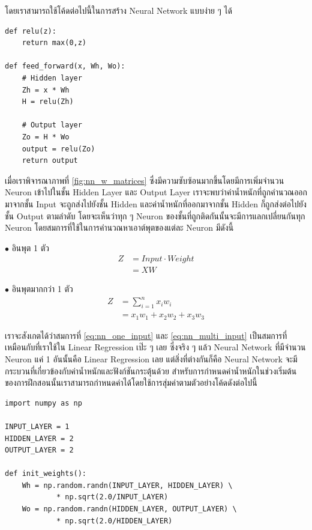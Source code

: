 โดยเราสามารถใช้โค้ดต่อไปนี้ในการสร้าง Neural Network แบบง่าย ๆ ได้

\begin{lstlisting}[style=MyPython]
def relu(z):
    return max(0,z)

def feed_forward(x, Wh, Wo):
    # Hidden layer
    Zh = x * Wh
    H = relu(Zh)

    # Output layer
    Zo = H * Wo
    output = relu(Zo)
    return output
\end{lstlisting}

\vspace{1em}

เมื่อเราพิจารณาภาพที่ \ref{fig:nn_w_matrices} ซึ่งมีความซับซ้อนมากขึ้นโดยมีการเพิ่มจำนวน Neuron เข้าไปในชั้น Hidden Layer และ Output Layer เราจะพบว่าค่าน้ำหนักที่ถูกคำนวณออกมาจากชั้น Input จะถูกส่งไปยังชั้น Hidden และค่าน้ำหนักที่ออกมาจากชั้น Hidden ก็ถูกส่งต่อไปยังชั้น Output ตามลำดับ โดยจะเห็นว่าทุก ๆ Neuron ของชั้นที่ถูกติดกันนั้นจะมีการแลกเปลี่ยนกันทุก Neuron โดยสมการที่ใช้ในการคำนวณหาเอาต์พุตของแต่ละ Neuron มีดังนี้

\noindent $\bullet$ อินพุต 1 ตัว
\begin{align}\label{eq:nn_one_input}
    Z & = Input \cdot Weight \nonumber \\
      & = X W
\end{align}

\noindent $\bullet$ อินพุตมากกว่า 1 ตัว
\begin{align}\label{eq:nn_multi_input}
    Z & = \sum_{i=1}^{n}x_i w_i \nonumber \\
      & = x_1 w_1 + x_2 w_2 + x_3 w_3
\end{align}

เราจะสังเกตได้ว่าสมการที่ \eqref{eq:nn_one_input} และ \eqref{eq:nn_multi_input} เป็นสมการที่เหมือนกับที่เราใช้ใน Linear Regression เป๊ะ ๆ เลย ซึ่งจริง ๆ แล้ว Neural Network ที่มีจำนวน Neuron แค่ 1 อันนั้นคือ Linear Regression เลย แต่สิ่งที่ต่างกันก็คือ Neural Network จะมีกระบวนที่เกี่ยวข้องกับค่าน้ำหนักและฟังก์ชันกระตุ้นด้วย สำหรับการกำหนดค่าน้ำหนักในช่วงเริ่มต้นของการฝึกสอนนั้นเราสามารถกำหนดค่าได้โดยใช้การสุ่มค่าตามตัวอย่างโค้ดดังต่อไปนี้

\begin{lstlisting}[style=MyPython]
import numpy as np

INPUT_LAYER = 1
HIDDEN_LAYER = 2
OUTPUT_LAYER = 2

def init_weights():
    Wh = np.random.randn(INPUT_LAYER, HIDDEN_LAYER) \
            * np.sqrt(2.0/INPUT_LAYER)
    Wo = np.random.randn(HIDDEN_LAYER, OUTPUT_LAYER) \
            * np.sqrt(2.0/HIDDEN_LAYER)
\end{lstlisting}


